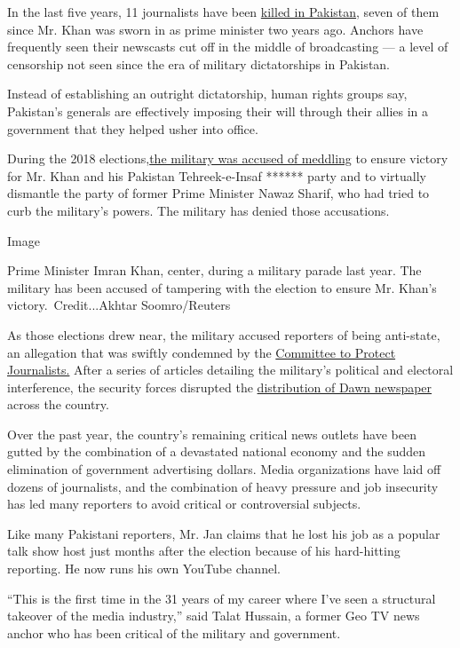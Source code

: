 In the last five years, 11 journalists have been
\href{https://cpj.org/asia/pakistan/}{killed in Pakistan}, seven of them
since Mr. Khan was sworn in as prime minister two years ago. Anchors
have frequently seen their newscasts cut off in the middle of
broadcasting --- a level of censorship not seen since the era of
military dictatorships in Pakistan.

Instead of establishing an outright dictatorship, human rights groups
say, Pakistan's generals are effectively imposing their will through
their allies in a government that they helped usher into office.

During the 2018
elections,\href{https://www.nytimes.com/2018/07/21/world/asia/pakistan-election-military.html}{the
military was accused of meddling} to ensure victory for Mr. Khan and his
Pakistan Tehreek-e-Insaf ****** party and to virtually dismantle the
party of former Prime Minister Nawaz Sharif, who had tried to curb the
military's powers. The military has denied those accusations.

Image

Prime Minister Imran Khan, center, during a military parade last year.
The military has been accused of tampering with the election to ensure
Mr. Khan's victory.~Credit...Akhtar Soomro/Reuters

As those elections drew near, the military accused reporters of being
anti-state, an allegation that was swiftly condemned by the
\href{https://cpj.org/2018/06/pakistan-army-spokesperson-accuses-journalists-of/}{Committee
to Protect Journalists.} After a series of articles detailing the
military's political and electoral interference, the security forces
disrupted the
\href{https://cpj.org/2018/05/pakistani-authorities-disrupt-distribution-of-dawn/}{distribution
of Dawn newspaper} across the country.

Over the past year, the country's remaining critical news outlets have
been gutted by the combination of a devastated national economy and the
sudden elimination of government advertising dollars. Media
organizations have laid off dozens of journalists, and the combination
of heavy pressure and job insecurity has led many reporters to avoid
critical or controversial subjects.

Like many Pakistani reporters, Mr. Jan claims that he lost his job as a
popular talk show host just months after the election because of his
hard-hitting reporting. He now runs his own YouTube channel.

``This is the first time in the 31 years of my career where I've seen a
structural takeover of the media industry,'' said Talat Hussain, a
former Geo TV news anchor who has been critical of the military and
government.

